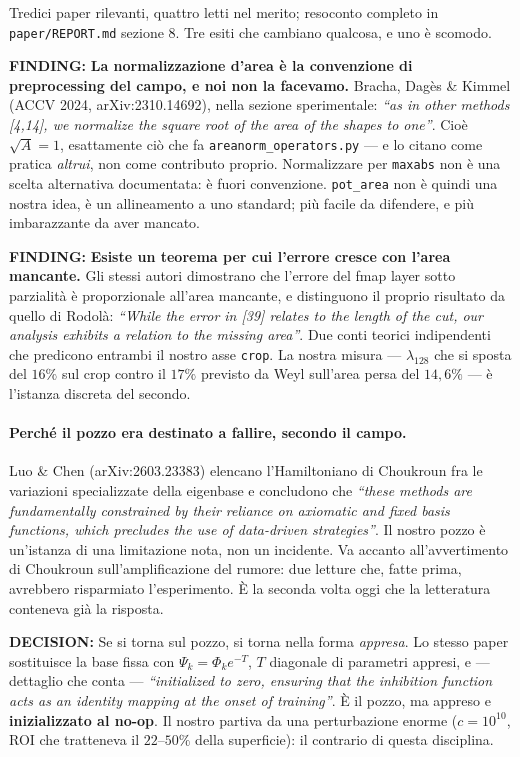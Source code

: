 \documentclass[11pt,a4paper]{article}
\newcommand{\finding}[1]{\textcolor{finding}{\textbf{FINDING:}} #1}
\newcommand{\decision}[1]{\textcolor{decision}{\textbf{DECISION:}} #1}
\begin{document}
Tredici paper rilevanti, quattro letti nel merito; resoconto completo in
\texttt{paper/REPORT.md} sezione 8. Tre esiti che cambiano qualcosa, e uno \`e scomodo.

\finding{\textbf{La normalizzazione d'area \`e la convenzione di preprocessing del campo, e noi
non la facevamo.} Bracha, Dag\`es \& Kimmel (ACCV 2024, arXiv:2310.14692), nella sezione
sperimentale: \emph{``as in other methods [4,14], we normalize the square root of the area of the
shapes to one''}. Cio\`e $\sqrt{A}=1$, esattamente ci\`o che fa
\texttt{areanorm\_operators.py} --- e lo citano come pratica \emph{altrui}, non come contributo
proprio. Normalizzare per \texttt{maxabs} non \`e una scelta alternativa documentata: \`e fuori
convenzione. \texttt{pot\_area} non \`e quindi una nostra idea, \`e un allineamento a uno
standard; pi\`u facile da difendere, e pi\`u imbarazzante da aver mancato.}

\finding{\textbf{Esiste un teorema per cui l'errore cresce con l'area mancante.} Gli stessi
autori dimostrano che l'errore del fmap layer sotto parzialit\`a \`e proporzionale all'area
mancante, e distinguono il proprio risultato da quello di Rodol\`a: \emph{``While the error in
[39] relates to the length of the cut, our analysis exhibits a relation to the missing area''}.
Due conti teorici indipendenti che predicono entrambi il nostro asse \texttt{crop}. La nostra
misura --- $\lambda_{128}$ che si sposta del $16\%$ sul crop contro il $17\%$ previsto da Weyl
sull'area persa del $14{,}6\%$ --- \`e l'istanza discreta del secondo.}

\paragraph{Perch\'e il pozzo era destinato a fallire, secondo il campo.} Luo \& Chen
(arXiv:2603.23383) elencano l'Hamiltoniano di Choukroun fra le variazioni specializzate della
eigenbase e concludono che \emph{``these methods are fundamentally constrained by their reliance
on axiomatic and fixed basis functions, which precludes the use of data-driven strategies''}. Il
nostro pozzo \`e un'istanza di una limitazione nota, non un incidente. Va accanto all'avvertimento
di Choukroun sull'amplificazione del rumore: due letture che, fatte prima, avrebbero risparmiato
l'esperimento. \`E la seconda volta oggi che la letteratura conteneva gi\`a la risposta.

\decision{Se si torna sul pozzo, si torna nella forma \emph{appresa}. Lo stesso paper sostituisce
la base fissa con $\Psi_k = \Phi_k e^{-T}$, $T$ diagonale di parametri appresi, e --- dettaglio
che conta --- \emph{``initialized to zero, ensuring that the inhibition function acts as an
identity mapping at the onset of training''}. \`E il pozzo, ma appreso e \textbf{inizializzato al
no-op}. Il nostro partiva da una perturbazione enorme ($c=10^{10}$, ROI che tratteneva il
$22$--$50\%$ della superficie): il contrario di questa disciplina.}
\end{document}
